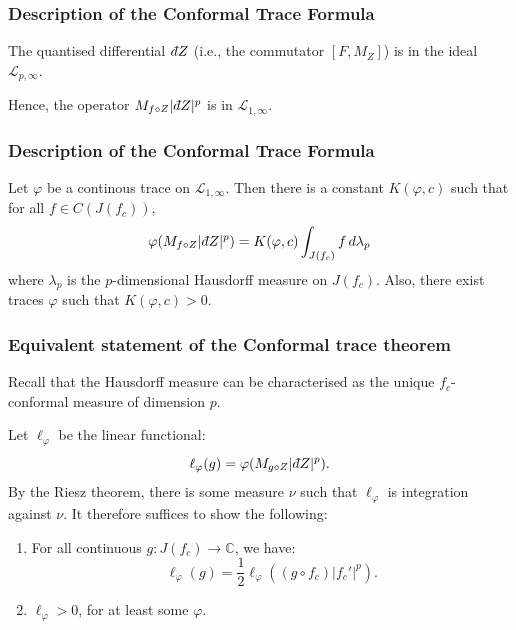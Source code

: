 \documentclass{beamer} %
\theoremstyle{definition} %
\newcommand{\Cplx}{\mathbb{C}}
\newcommand{\Lc}{\mathcal{L}}
\def\qd{\,{\mathchar'26\mkern-12mu d}}
\begin{document}
\begin{frame}\frametitle{Description of the Conformal Trace Formula}
    \begin{lemma}
        The quantised differential $\qd Z$ (i.e., the commutator $[F,M_Z]$) is in the ideal $\Lc_{p,\infty}$.
    \end{lemma}
    Hence, the operator $M_{f\circ Z}|\qd Z|^p$ is in $\Lc_{1,\infty}$.
\end{frame}

\begin{frame}\frametitle{Description of the Conformal Trace Formula}
    \begin{theorem}
        Let $\varphi$ be a continous trace on $\Lc_{1,\infty}$. Then there is a constant $K(\varphi,c)$ such
        that for all $f \in C(J(f_c))$,
        \begin{equation*}
            \varphi(M_{f\circ Z}|\qd Z|^p) = K(\varphi,c)\int_{J(f_c)} f\,d\lambda_p
        \end{equation*}
        where $\lambda_p$ is the $p$-dimensional Hausdorff measure on $J(f_c)$.
        Also, there exist traces $\varphi$ such that $K(\varphi,c) > 0$.
    \end{theorem}
\end{frame}

\begin{frame}\frametitle{Equivalent statement of the Conformal trace theorem}
    Recall that the Hausdorff measure can be characterised as the unique $f_c$-conformal measure of dimension $p$. 
    
    Let $\ell_{\varphi}$ be the linear functional:
    \begin{equation*}
        \ell_{\varphi}(g) = \varphi(M_{g\circ Z}|\qd Z|^p).
    \end{equation*}
    By the Riesz theorem, there is some measure $\nu$ such that $\ell_\varphi$ is integration against $\nu$.
    It therefore suffices to show the following:
    \begin{enumerate}
        \item{} For all continuous $g:J(f_c)\to \Cplx$, we have:
            \begin{equation*}
                \ell_{\varphi}(g) = \frac{1}{2}\ell_\varphi((g\circ f_c)|f_c'|^p).
            \end{equation*}
        \item{} $\ell_{\varphi} > 0$, for at least some $\varphi$.
    \end{enumerate}
\end{frame}
\end{document}
